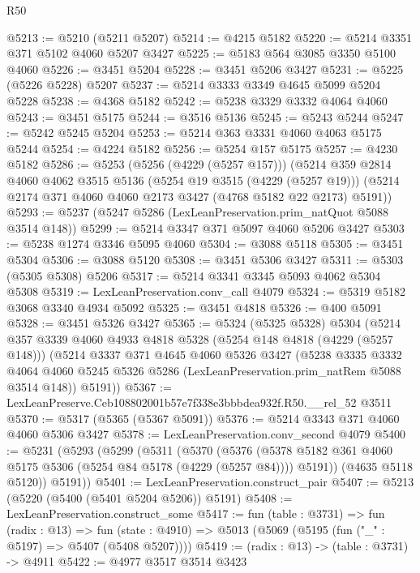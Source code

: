 \begin{lexlean}{R50}
\begin{coremodule}
@5213 := @5210 (@5211 @5207)
@5214 := @4215 @5182
@5220 := @5214 @3351 @371 @5102 @4060 @5207 @3427
@5225 := @5183 @564 @3085 @3350 @5100 @4060
@5226 := @3451 @5204
@5228 := @3451 @5206 @3427
@5231 := @5225 (@5226 @5228) @5207
@5237 := @5214 @3333 @3349 @4645 @5099 @5204 @5228
@5238 := @4368 @5182
@5242 := @5238 @3329 @3332 @4064 @4060
@5243 := @3451 @5175
@5244 := @3516 @5136
@5245 := @5243 @5244
@5247 := @5242 @5245 @5204
@5253 := @5214 @363 @3331 @4060 @4063 @5175 @5244
@5254 := @4224 @5182
@5256 := @5254 @157 @5175
@5257 := @4230 @5182
@5286 := @5253
    (@5256 (@4229 (@5257 @157)))
    (@5214
      @359
      @2814
      @4060
      @4062
      @3515
      @5136
      (@5254 @19 @3515 (@4229 (@5257 @19)))
      (@5214 @2174 @371 @4060 @4060 @2173 @3427 (@4768 @5182 @22 @2173) @5191))
@5293 := @5237 (@5247 @5286 (LexLeanPreservation.prim_natQuot @5088 @3514 @148))
@5299 := @5214 @3347 @371 @5097 @4060 @5206 @3427
@5303 := @5238 @1274 @3346 @5095 @4060
@5304 := @3088 @5118
@5305 := @3451 @5304
@5306 := @3088 @5120
@5308 := @3451 @5306 @3427
@5311 := @5303 (@5305 @5308) @5206
@5317 := @5214 @3341 @3345 @5093 @4062 @5304 @5308
@5319 := LexLeanPreservation.conv_call @4079
@5324 := @5319 @5182 @3068 @3340 @4934 @5092
@5325 := @3451 @4818
@5326 := @400 @5091
@5328 := @3451 @5326 @3427
@5365 := @5324
    (@5325 @5328)
    @5304
    (@5214
      @357
      @3339
      @4060
      @4933
      @4818
      @5328
      (@5254 @148 @4818 (@4229 (@5257 @148)))
      (@5214
        @3337
        @371
        @4645
        @4060
        @5326
        @3427
        (@5238
          @3335
          @3332
          @4064
          @4060
          @5245
          @5326
          @5286
          (LexLeanPreservation.prim_natRem @5088 @3514 @148))
        @5191))
@5367 := LexLeanPreserve.Ceb108802001b57e7f338e3bbbdea932f.R50.__rel_52 @3511
@5370 := @5317 (@5365 (@5367 @5091))
@5376 := @5214 @3343 @371 @4060 @4060 @5306 @3427
@5378 := LexLeanPreservation.conv_second @4079
@5400 := @5231
    (@5293
      (@5299
        (@5311
          (@5370
            (@5376
              (@5378 @5182 @361 @4060 @5175 @5306 (@5254 @84 @5178 (@4229 (@5257 @84))))
              @5191))
          (@4635 @5118 @5120))
        @5191))
@5401 := LexLeanPreservation.construct_pair
@5407 := @5213 (@5220 (@5400 (@5401 @5204 @5206)) @5191)
@5408 := LexLeanPreservation.construct_some
@5417 := fun (table : @3731) =>
  fun (radix : @13) =>
  fun (state : @4910) => @5013 (@5069 (@5195 (fun ("_" : @5197) => @5407 (@5408 @5207))))
@5419 := (radix : @13) -> (table : @3731) -> @4911
@5422 := @4977 @3517 @3514 @3423

\end{coremodule}
\end{lexlean}
